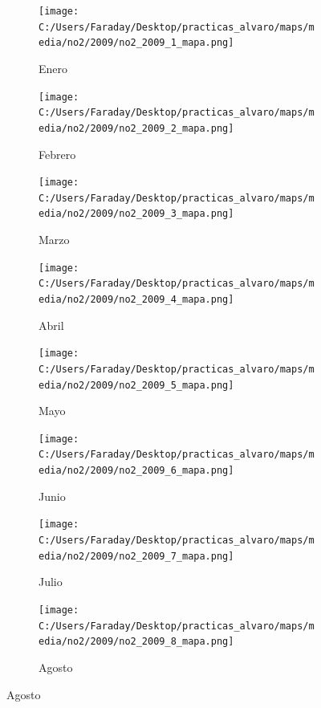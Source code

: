 \documentclass[12pt]{beamer}
\begin{document}
\begin{frame}[squeeze]
\tiny
\begin{figure}[H]
\centering
\begin{subfigure}[H]{0.20\textwidth}
\texttt{[image: C:/Users/Faraday/Desktop/practicas\_alvaro/maps/media/no2/2009/no2\_2009\_1\_mapa.png]}
\captionsetup{labelformat=empty}
\caption{\scriptsize Enero}
\label{fig:map-no2-2009-1}
\end{subfigure}
%
\begin{subfigure}[H]{0.20\textwidth}
\texttt{[image: C:/Users/Faraday/Desktop/practicas\_alvaro/maps/media/no2/2009/no2\_2009\_2\_mapa.png]}
\captionsetup{labelformat=empty}
\caption{\scriptsize Febrero}
\label{fig:map-no2-2009-2}
\end{subfigure}
%
\begin{subfigure}[H]{0.20\textwidth}
\texttt{[image: C:/Users/Faraday/Desktop/practicas\_alvaro/maps/media/no2/2009/no2\_2009\_3\_mapa.png]}
\captionsetup{labelformat=empty}
\caption{\scriptsize Marzo}
\label{fig:map-no2-2009-3}
\end{subfigure}
%
\begin{subfigure}[H]{0.20\textwidth}
\texttt{[image: C:/Users/Faraday/Desktop/practicas\_alvaro/maps/media/no2/2009/no2\_2009\_4\_mapa.png]}
\captionsetup{labelformat=empty}
\caption{\scriptsize Abril}
\label{fig:map-no2-2009-4}
\end{subfigure}

\begin{subfigure}[H]{0.20\textwidth}
\texttt{[image: C:/Users/Faraday/Desktop/practicas\_alvaro/maps/media/no2/2009/no2\_2009\_5\_mapa.png]}
\captionsetup{labelformat=empty}
\caption{\scriptsize Mayo}
\label{fig:map-no2-2009-5}
\end{subfigure}
%
\begin{subfigure}[H]{0.20\textwidth}
\texttt{[image: C:/Users/Faraday/Desktop/practicas\_alvaro/maps/media/no2/2009/no2\_2009\_6\_mapa.png]}
\captionsetup{labelformat=empty}
\caption{\scriptsize Junio}
\label{fig:map-no2-2009-6}
\end{subfigure}
%
\begin{subfigure}[H]{0.20\textwidth}
\texttt{[image: C:/Users/Faraday/Desktop/practicas\_alvaro/maps/media/no2/2009/no2\_2009\_7\_mapa.png]}
\captionsetup{labelformat=empty}
\caption{\scriptsize Julio}
\label{fig:map-no2-2009-7}
\end{subfigure}
%
\begin{subfigure}[H]{0.20\textwidth}
\texttt{[image: C:/Users/Faraday/Desktop/practicas\_alvaro/maps/media/no2/2009/no2\_2009\_8\_mapa.png]}
\captionsetup{labelformat=empty}
\caption{\scriptsize Agosto}
\label{fig:map-no2-2009-8}
\end{subfigure}


\end{figure}
\end{frame}
\end{document}
